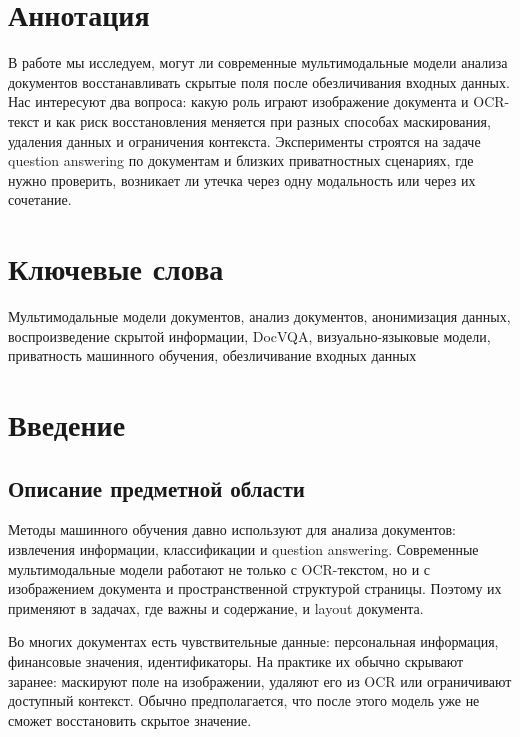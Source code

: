 \documentclass[a4paper,12pt]{extarticle}
\begin{document}
\newpage
\setcounter{page}{2}

{
	\hypersetup{linkcolor=black}
	\tableofcontents
}

\newpage

\newpage
\section*{Аннотация}
В работе мы исследуем, могут ли современные мультимодальные модели анализа документов восстанавливать скрытые поля после обезличивания входных данных. Нас интересуют два вопроса: какую роль играют изображение документа и OCR-текст и как риск восстановления меняется при разных способах маскирования, удаления данных и ограничения контекста. Эксперименты строятся на задаче question answering по документам и близких приватностных сценариях, где нужно проверить, возникает ли утечка через одну модальность или через их сочетание.


\section*{Ключевые слова}
Мультимодальные модели документов,
анализ документов,
анонимизация данных,
воспроизведение скрытой информации, DocVQA, визуально-языковые модели, приватность машинного обучения, обезличивание входных данных
\pagebreak

\section{Введение}

\subsection{Описание предметной области}

Методы машинного обучения давно используют для анализа документов: извлечения информации, классификации и question answering. Современные мультимодальные модели работают не только с OCR-текстом, но и с изображением документа и пространственной структурой страницы. Поэтому их применяют в задачах, где важны и содержание, и layout документа.

Во многих документах есть чувствительные данные: персональная информация, финансовые значения, идентификаторы. На практике их обычно скрывают заранее: маскируют поле на изображении, удаляют его из OCR или ограничивают доступный контекст. Обычно предполагается, что после этого модель уже не сможет восстановить скрытое значение.
\end{document}
